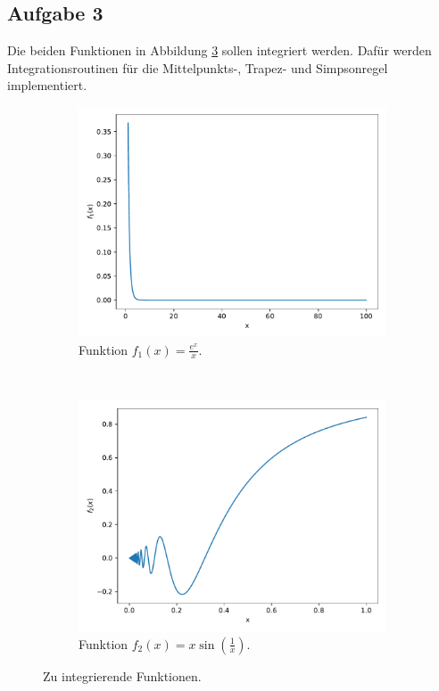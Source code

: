\subsection*{Aufgabe 3}

Die beiden Funktionen in Abbildung \ref{fig:f} sollen integriert werden. Dafür werden Integrationsroutinen für die Mittelpunkts-, Trapez- und Simpsonregel implementiert.
\begin{figure}[H]
    \centering
    \begin{subfigure}[b]{0.45\textwidth}
        \includegraphics[width=\textwidth]{A3/build/f1.pdf}
        \caption{Funktion \(f_1(x) =  \frac{e^x}{x}\).}
        \label{fig:f1}
    \end{subfigure}
    ~ %
    \begin{subfigure}[b]{0.45\textwidth}
        \includegraphics[width=\textwidth]{A3/build/f2.pdf}
        \caption{Funktion \(f_2(x) = x \sin{\left(\frac{1}{x}\right)}\).}
        \label{fig:f2}
    \end{subfigure}
    \caption{Zu integrierende Funktionen.}\label{fig:f}
\end{figure}

